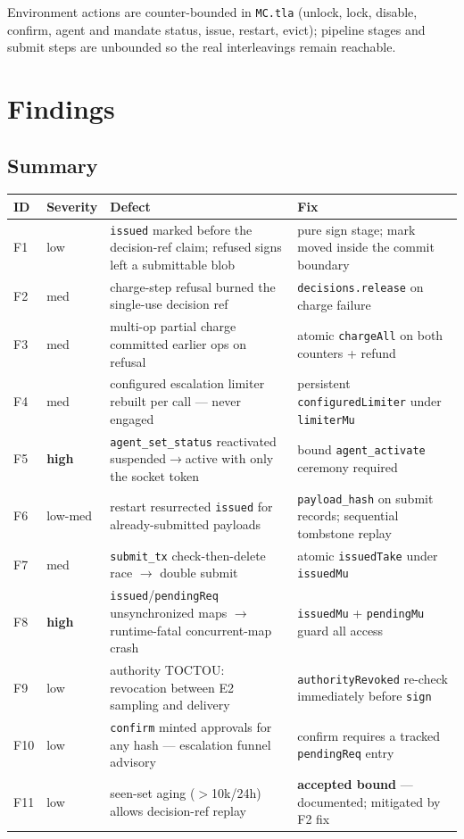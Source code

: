 \documentclass[11pt]{article}
\newcommand{\code}[1]{\texttt{#1}}
\newcommand{\file}[1]{\texttt{#1}}
\newcommand{\sev}[1]{\textbf{#1}}
\begin{document}
Environment actions are counter-bounded in \file{MC.tla} (unlock, lock,
disable, confirm, agent and mandate status, issue, restart, evict); pipeline stages
and submit steps are unbounded so the real interleavings remain reachable.

\section{Findings}

\subsection{Summary}

\begin{longtable}{@{}lp{}p{}p{}@{}}
\toprule
\textbf{ID} & \textbf{Severity} & \textbf{Defect} & \textbf{Fix} \\
\midrule
\endhead
F1 & low    & \code{issued} marked before the decision-ref claim; refused signs left a submittable blob & pure sign stage; mark moved inside the commit boundary \\
F2 & med    & charge-step refusal burned the single-use decision ref & \code{decisions.release} on charge failure \\
F3 & med    & multi-op partial charge committed earlier ops on refusal & atomic \code{chargeAll} on both counters + refund \\
F4 & med    & configured escalation limiter rebuilt per call — never engaged & persistent \code{configuredLimiter} under \code{limiterMu} \\
F5 & \sev{high} & \code{agent\_set\_status} reactivated suspended$\to$active with only the socket token & bound \code{agent\_activate} ceremony required \\
F6 & low-med & restart resurrected \code{issued} for already-submitted payloads & \code{payload\_hash} on submit records; sequential tombstone replay \\
F7 & med    & \code{submit\_tx} check-then-delete race $\to$ double submit & atomic \code{issuedTake} under \code{issuedMu} \\
F8 & \sev{high} & \code{issued}/\code{pendingReq} unsynchronized maps $\to$ runtime-fatal concurrent-map crash & \code{issuedMu} + \code{pendingMu} guard all access \\
F9 & low    & authority TOCTOU: revocation between E2 sampling and delivery & \code{authorityRevoked} re-check immediately before \code{sign} \\
F10 & low   & \code{confirm} minted approvals for any hash — escalation funnel advisory & confirm requires a tracked \code{pendingReq} entry \\
F11 & low   & seen-set aging ($>$10k/24h) allows decision-ref replay & \textbf{accepted bound} — documented; mitigated by F2 fix \\
\bottomrule
\end{longtable}
\end{document}
